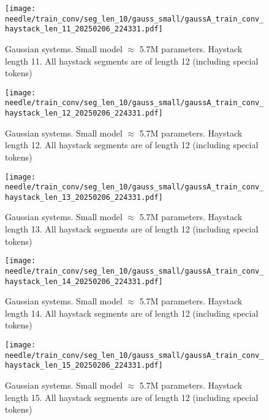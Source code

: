 \begin{figure}[h]
    \centering
    \texttt{[image: needle/train\_conv/seg\_len\_10/gauss\_small/gaussA\_train\_conv\_haystack\_len\_11\_20250206\_224331.pdf]}
    \caption{Gaussian systems. Small model $\approx$ 5.7M parameters. Haystack length 11. All haystack segments are of length 12 (including special tokens)}
    \label{fig:gauss_small_needle_train_conv_haystack_len_11_all_haystack_len_12}

\end{figure}

\begin{figure}[h]
    \centering
    \texttt{[image: needle/train\_conv/seg\_len\_10/gauss\_small/gaussA\_train\_conv\_haystack\_len\_12\_20250206\_224331.pdf]}
    \caption{Gaussian systems. Small model $\approx$ 5.7M parameters. Haystack length 12. All haystack segments are of length 12 (including special tokens)}
    \label{fig:gauss_small_needle_train_conv_haystack_len_12_all_haystack_len_12}

\end{figure}

\begin{figure}[h]
    \centering
    \texttt{[image: needle/train\_conv/seg\_len\_10/gauss\_small/gaussA\_train\_conv\_haystack\_len\_13\_20250206\_224331.pdf]}
    \caption{Gaussian systems. Small model $\approx$ 5.7M parameters. Haystack length 13. All haystack segments are of length 12 (including special tokens)}
    \label{fig:gauss_small_needle_train_conv_haystack_len_13_all_haystack_len_12}

\end{figure}


\begin{figure}[h]
    \centering
    \texttt{[image: needle/train\_conv/seg\_len\_10/gauss\_small/gaussA\_train\_conv\_haystack\_len\_14\_20250206\_224331.pdf]}
    \caption{Gaussian systems. Small model $\approx$ 5.7M parameters. Haystack length 14. All haystack segments are of length 12 (including special tokens)}
    \label{fig:gauss_small_needle_train_conv_haystack_len_14_all_haystack_len_12}

\end{figure}

\begin{figure}[h]
    \centering
    \texttt{[image: needle/train\_conv/seg\_len\_10/gauss\_small/gaussA\_train\_conv\_haystack\_len\_15\_20250206\_224331.pdf]}
    \caption{Gaussian systems. Small model $\approx$ 5.7M parameters. Haystack length 15. All haystack segments are of length 12 (including special tokens)}
    \label{fig:gauss_small_needle_train_conv_haystack_len_15_all_haystack_len_12}

\end{figure}

